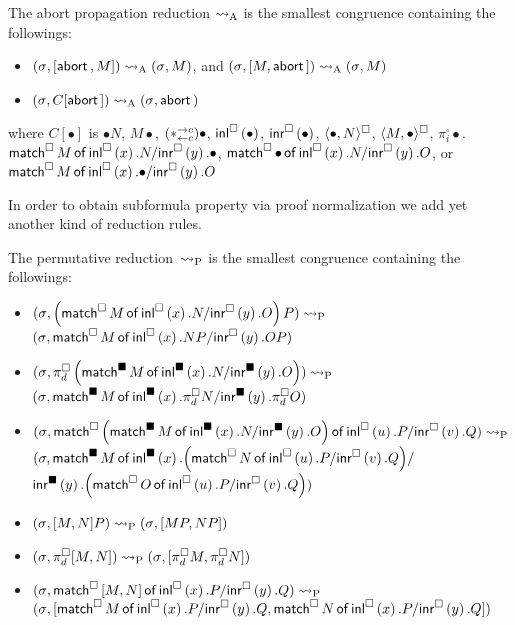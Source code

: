 {\begin{definition}
 The abort propagation reduction $\areduce$ is the smallest
 congruence containing the
 followings:
\begin{itemize}
 \item  $\conf{}{\cotuple{\abort, M}}\areduce
 \conf{}{M}$, and
   $\conf{}{\cotuple{M,\abort}}\areduce
 \conf{}{M}$
 \item  $\conf{}{C[\abort]}\areduce
 \conf{}{\abort}$
\end{itemize}
 where $C[\bullet]$ is
$\bullet N$,
${M \bullet}$,
$(\comod c c)\bullet$,
$\sinl \bullet$,
$\sinr \bullet$,
$\spair {\bullet, N}$,
$\spair {M, \bullet}$,
$\pi^\square_i \bullet$.
$\smat M x N y \bullet$,
$\smat  \bullet x N y O$, or  \\
$\smat  M x \bullet y O$
\end{definition}
In order to obtain subformula property
 via proof normalization
we add yet another kind of reduction rules.
\begin{definition}
 The permutative reduction~$\preduce$ is the smallest congruence
 containing the followings:
\begin{itemize}
 \small
 \item $\conf{}{ \left(\smat  M x N y O\right) P }\preduce$ \\
       $\conf{}{ \smat M x {N P} y {O P} }$
 \item $\conf{}{ \pi^\square_d \left(\bsmat M x N y
       O\right)}\preduce$\\
       $\conf{}{ \bsmat M x
       {\pi^\square_d N} y {\pi^\square_d O} }$
 \item {
       $\conf{}{ \smat
                          {\left(\bsmat  M x N y O\right)}
                          u P v Q
                      }\preduce$ \\
       $(\lstore,
        \mathsf{match}^{\blacksquare}\,{M}\,\mathsf{of}\, \bsinl{x}. {
                          {\left(\smat N u P v Q\right)}
       } /$ \\ \phantom{mmmmmmmmmmm}$
       \bsinr{y}. {\left(\smat  O u P v Q\right)}
                      )
       $}
 \item $\conf{}{ \cotuple{M, N} P }\preduce
        \conf{}{ \cotuple{MP, NP} }$
 \item $\conf{}{ \pi^\square_d\cotuple{M,N} }\preduce
        \conf{}{ \cotuple{\pi^\square_d M, \pi^\square_d N} }$
 \item $\conf{}{ \smat {\cotuple{M,N}} x P y Q }\preduce$\\
       $\conf{}{ \cotuple{
                          \smat  M x P y Q,
                          \smat N x P y Q
                        } }$
\end{itemize}
\end{definition}

}

